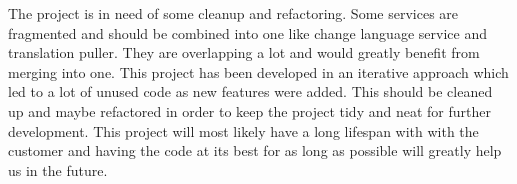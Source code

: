The project is in need of some cleanup and refactoring. Some services are fragmented and should be combined into one like change language service and translation puller. They are overlapping a lot and would greatly benefit from merging into one. This project has been developed in an iterative approach which led to a lot of unused code as new features were added. This should be cleaned up and maybe refactored in order to keep the project tidy and neat for further development. This project will most likely have a long lifespan with with the customer and having the code at its best for as long as possible will greatly help us in the future.
